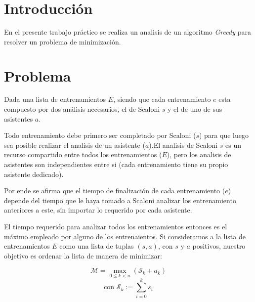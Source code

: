 \section{Introducci\'on}

En el presente trabajo pr\'actico se realiza un analisis de un algoritmo \textit{Greedy} para resolver un problema de minimizaci\'on.

\section{Problema}

Dada una lista de entrenamientos $E$, siendo que cada entrenamiento $e$ esta compuesto por dos an\'alisis necesarios, el de Scaloni $s$ y el de uno de sus asistentes $a$.

Todo entrenamiento debe primero ser completado por Scaloni ($s$) para que luego sea posible realizar el analisis de un asistente ($a$).El analisis de Scaloni $s$  es un recurso compartido entre todos los entrenamientos ($E$), pero los analisis de asistentes son independientes entre si (cada entrenamiento tiene su propio asistente dedicado).

Por ende se afirma que el tiempo de finalización de cada entrenamiento ($e$) depende del tiempo que le haya tomado a Scaloni analizar los entrenamiento anteriores a este, sin importar lo requerido por cada asistente.

El tiempo requerido para analizar todos los entrenamientos entonces es el m\'aximo empleado por alguno de los entrenaientos. Si consideramos a la lista de entrenamientos $E$ como una lista de tuplas $\left( s, a \right)$, con $s$ y $a$ positivos, nuestro objetivo es ordenar la lista de manera de minimizar:

\begin{equation}
    \mathcal{M} = \max_{0 \le k < n}\left(\mathcal{S}_k + a_k\right)
\end{equation}
\begin{equation*}
    \text{con } \mathcal{S}_k := \sum_{i=0}^{k} s_i
\end{equation*}